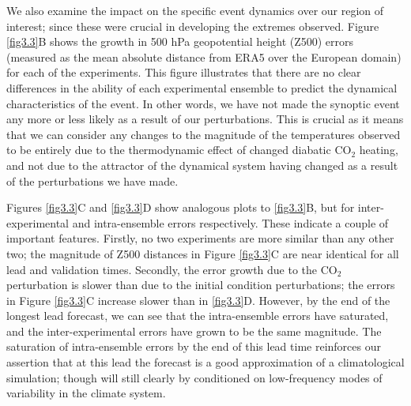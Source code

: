   We also examine the impact on the specific event dynamics over our region of interest; since these were crucial in developing the extremes observed. Figure \ref{fig3.3}B shows the growth in 500 hPa geopotential height (Z500) errors (measured as the mean absolute distance from ERA5 over the European domain) for each of the experiments. This figure illustrates that there are no clear differences in the ability of each experimental ensemble to predict the dynamical characteristics of the event. In other words, we have not made the synoptic event any more or less likely as a result of our perturbations. This is crucial as it means that we can consider any changes to the magnitude of the temperatures observed to be entirely due to the thermodynamic effect of changed diabatic CO$_2$ heating, and not due to the attractor of the dynamical system having changed as a result of the perturbations we have made.
  
  Figures \ref{fig3.3}C and \ref{fig3.3}D show analogous plots to \ref{fig3.3}B, but for inter-experimental and intra-ensemble errors respectively. These indicate a couple of important features. Firstly, no two experiments are more similar than any other two; the magnitude of Z500 distances in Figure \ref{fig3.3}C are near identical for all lead and validation times. Secondly, the error growth due to the CO$_2$ perturbation is slower than due to the initial condition perturbations; the errors in Figure \ref{fig3.3}C increase slower than in \ref{fig3.3}D. However, by the end of the longest lead forecast, we can see that the intra-ensemble errors have saturated, and the inter-experimental errors have grown to be the same magnitude. The saturation of intra-ensemble errors by the end of this lead time reinforces our assertion that at this lead the forecast is a good approximation of a climatological simulation; though will still clearly by conditioned on low-frequency modes of variability in the climate system.

